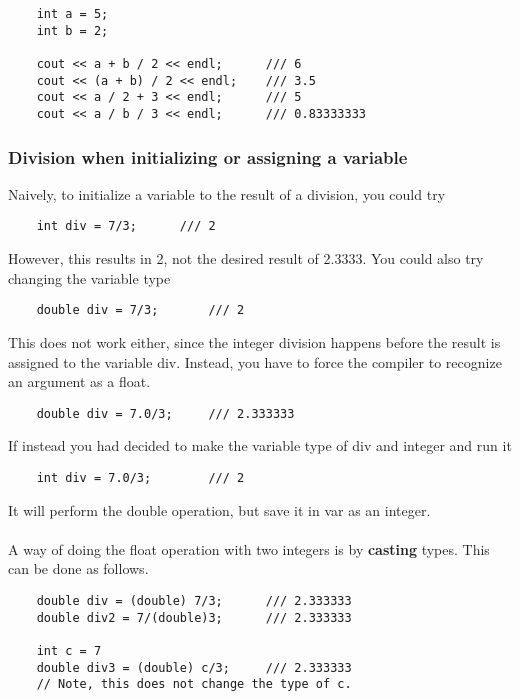 \documentclass[]{article}
\begin{document}
\begin{lstlisting}
	int a = 5;
	int b = 2;
	
	cout << a + b / 2 << endl;  	/// 6
	cout << (a + b) / 2 << endl;  	/// 3.5
	cout << a / 2 + 3 << endl;  	/// 5
	cout << a / b / 3 << endl;  	/// 0.83333333
\end{lstlisting}

\subsubsection{Division when initializing or assigning a variable}

Naively, to initialize a variable to the result of a division, you could try

\begin{lstlisting}
	int div = 7/3;		/// 2
\end{lstlisting}
\bigbreak

However, this results in 2, not the desired result of 2.3333. You could also try changing the variable type

\begin{lstlisting}
	double div = 7/3;		/// 2
\end{lstlisting}
\bigbreak

This does not work either, since the integer division happens before the result is assigned to the variable div. Instead, you have to force the compiler to recognize an argument as a float.

\begin{lstlisting}
	double div = 7.0/3;		/// 2.333333
\end{lstlisting}
\bigbreak

If instead you had decided to make the variable type of div and integer and run it

\begin{lstlisting}
	int div = 7.0/3;		/// 2
\end{lstlisting}
\bigbreak

It will perform the double operation, but save it in var as an integer. \\\\

A way of doing the float operation with two integers is by \textbf{casting} types. This can be done as follows.

\begin{lstlisting}
	double div = (double) 7/3;		/// 2.333333
	double div2 = 7/(double)3;		/// 2.333333
	
	int c = 7
	double div3 = (double) c/3;		/// 2.333333
	// Note, this does not change the type of c.
\end{lstlisting}
\bigbreak
\end{document}
